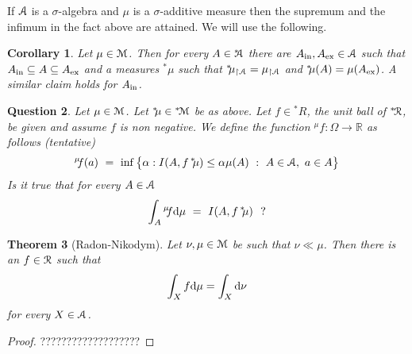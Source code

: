 \documentclass[12pt,letterpaper,oneside,reqno]{amsart}
\theoremstyle{plain}
\newtheorem{theorem}{Theorem}%
\newtheorem{corollary}[theorem]{Corollary}
\newtheorem{question}[theorem]{Question}
\theoremstyle{remark}
\begin{document}
If ${\EuScript A}$ is a $\sigma$-algebra and $\mu$ is a $\sigma$-additive measure then the supremum and the infimum in the fact above are attained.
We will use the following.

\begin{corollary}
  Let $\mu\in{\EuScript M}$.
  Then for every $A\in{}^{*\!\!\!}{\EuScript A}$ there are $A_{\rm in},A_{\rm ex}\in{\EuScript A}$ such that $A_{\rm in}\subseteq A\subseteq A_{\rm ex}$ and a measures ${}^{*\!\!}\mu$ such that 
  ${}^{*\!\!}\mu_{\restriction{\EuScript A}}=\mu_{\restriction{\EuScript A}}$ and ${}^{*\!\!}\mu(A)=\mu(A_{\rm ex})$.  
  A similar claim holds for $A_{\rm in}$.
\end{corollary}

\begin{question}
  Let $\mu\in{\EuScript M}$.
  Let ${}^{*\!\!}\mu\in{}^{*\!}{\EuScript M}$ be as above.
  Let $f\in{}^{*\!\!}R$, the unit ball of ${}^{*\!}{\EuScript R}$, be given and assume $f$ is non negative.
  We define the function ${}^{\mu\!\!}f:\Omega\to{\mathds R}$ as follows (tentative)
  $$
  {}^{\mu\!\!}f(a)\ =\ \inf\big\{\alpha : I(A, f\,{}^{*\!\!}\mu)\le \alpha \mu(A) \ :\ A\in{\EuScript A},\ a\in A\big\}
  $$
  Is it true that for every $A\in{\EuScript A}$ 
  $$
  \int_A{}^{\mu\!\!}f{\rm d}\mu\ =\ I(A,f\,{}^{*\!\!}\mu)\ \ ?
  $$
\end{question}

\begin{theorem}[Radon-Nikodym] 
  Let $\nu,\mu\in{\EuScript M}$ be such that $\nu\ll\mu$.
  Then there is an $f\in{\EuScript R}$ such that 
  $$
  \int_X f{\rm d}\mu = \int_X {\rm d}\nu
  $$
  for every $X\in{\EuScript A}$.
\end{theorem}

\begin{proof}
  ???????????????????
\end{proof}



\end{document}
